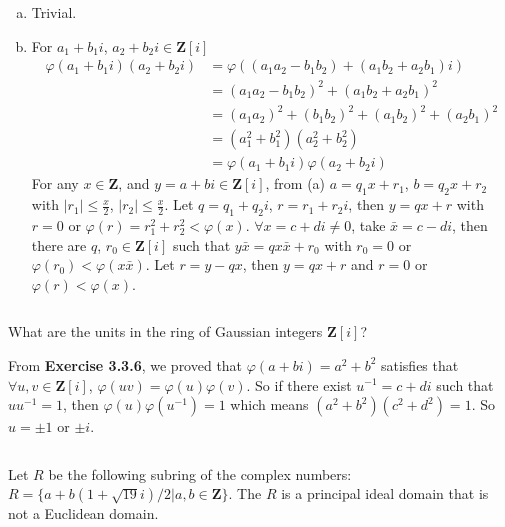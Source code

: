 \begin{answer}
    \begin{enumerate}[(a)]
        \item Trivial.
        \item For $a_{1}+b_{1}i$, $a_{2}+b_{2}i\in \mathbf{Z}[i]$ \[\begin{aligned}
            \varphi(a_{1}+b_{1}i)(a_{2}+b_{2}i)&=\varphi((a_{1}a_{2}-b_{1}b_{2})+(a_{1}b_{2}+a_{2}b_{1})i)\\&=(a_{1}a_{2}-b_{1}b_{2})^{2}+(a_{1}b_{2}+a_{2}b_{1})^{2}\\&=(a_{1}a_{2})^{2}+(b_{1}b_{2})^{2}+(a_{1}b_{2})^{2}+(a_{2}b_{1})^{2}\\&=(a_{1}^{2}+b_{1}^{2})(a_{2}^{2}+b_{2}^{2})\\&=\varphi(a_{1}+b_{1}i)\varphi(a_{2}+b_{2}i)
        \end{aligned}\]
        For any $x\in\mathbf{Z}$, and $y=a+bi\in\mathbf{Z}[i]$, from (a) $a=q_{1}x+r_{1}$, $b=q_{2}x+r_{2}$ with $\left| r_{1} \right| \leq \frac{x}{2}$, $\left| r_{2} \right| \leq \frac{x}{2}$. Let $q=q_{1}+q_{2}i$, $r=r_{1}+r_{2}i$, then $y=qx+r$ with $r=0$ or $\varphi(r)=r_{1}^{2}+r_{2}^{2}<\varphi(x)$. $\forall x=c+di\neq 0$, take $\bar{x}=c-di$, then there are $q$, $r_{0}\in\mathbf{Z}[i]$ such that $y\bar{x}=qx\bar{x}+r_{0}$ with $r_{0}=0$ or $\varphi(r_{0})<\varphi(x\bar{x})$. Let $r=y-qx$, then $y=qx+r$ and $r=0$ or $\varphi(r)<\varphi(x)$.
    \end{enumerate}
\end{answer}

$$ $$

\begin{ex}
    What are the units in the ring of Gaussian integers $\mathbf{Z}[i]$?
\end{ex}

\begin{answer}
    From \textbf{Exercise 3.3.6}, we proved that $\varphi(a+bi)=a^{2}+b^{2}$ satisfies that $\forall u,v\in \mathbf{Z}[i]$, $\varphi(uv)=\varphi(u)\varphi(v)$. So if there exist $u^{-1}=c+di$ such that $uu^{-1}=1$, then $\varphi(u)\varphi(u^{-1})=1$ which means $(a^{2}+b^{2})(c^{2}+d^{2})=1$. So $u=\pm 1$ or $\pm i$.
\end{answer}

$$ $$

\begin{ex}
    Let $R$ be the following subring of the complex numbers: $R=\{a+b(1+\sqrt{19}i) /2|a,b\in \mathbf{Z}\}$. The $R$ is a principal ideal domain that is not a Euclidean domain.
\end{ex}

